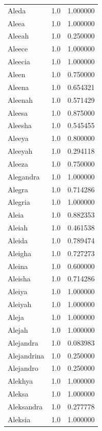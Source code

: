 \documentclass[
  letterpaper,
  DIV=11,
  numbers=noendperiod]{scrreprt}
\begin{document}
\begin{tabular}{lrr}
Aleda           &   1.0 &   1.000000 \\
Aleea           &   1.0 &   1.000000 \\
Aleeah          &   1.0 &   0.250000 \\
Aleece          &   1.0 &   1.000000 \\
Aleecia         &   1.0 &   1.000000 \\
Aleen           &   1.0 &   0.750000 \\
Aleena          &   1.0 &   0.654321 \\
Aleenah         &   1.0 &   0.571429 \\
Aleesa          &   1.0 &   0.875000 \\
Aleesha         &   1.0 &   0.545455 \\
Aleeya          &   1.0 &   0.800000 \\
Aleeyah         &   1.0 &   0.294118 \\
Aleeza          &   1.0 &   0.750000 \\
Alegandra       &   1.0 &   1.000000 \\
Alegra          &   1.0 &   0.714286 \\
Alegria         &   1.0 &   1.000000 \\
Aleia           &   1.0 &   0.882353 \\
Aleiah          &   1.0 &   0.461538 \\
Aleida          &   1.0 &   0.789474 \\
Aleigha         &   1.0 &   0.727273 \\
Aleina          &   1.0 &   0.600000 \\
Aleisha         &   1.0 &   0.714286 \\
Aleiya          &   1.0 &   1.000000 \\
Aleiyah         &   1.0 &   1.000000 \\
Aleja           &   1.0 &   1.000000 \\
Alejah          &   1.0 &   1.000000 \\
Alejandra       &   1.0 &   0.083983 \\
Alejandrina     &   1.0 &   0.250000 \\
Alejandro       &   1.0 &   0.250000 \\
Alekhya         &   1.0 &   1.000000 \\
Aleksa          &   1.0 &   1.000000 \\
Aleksandra      &   1.0 &   0.277778 \\
Aleksia         &   1.0 &   1.000000 \\

\end{tabular}
\end{document}
